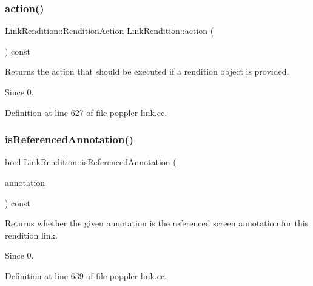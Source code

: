 \subsubsection{\texorpdfstring{action()}{action()}}
{\footnotesize\ttfamily \hyperlink{class_poppler_1_1_link_rendition_aede1a6b7156fe8973bdbeda39173704d}{Link\+Rendition\+::\+Rendition\+Action} Link\+Rendition\+::action (\begin{DoxyParamCaption}{ }\end{DoxyParamCaption}) const}

Returns the action that should be executed if a rendition object is provided.

\begin{DoxySince}{Since}
0. 
\end{DoxySince}


Definition at line 627 of file poppler-\/link.\+cc.

\mbox{\label{class_poppler_1_1_link_rendition_a91fad039261a67d42a94b9284e8ef048}} 
\subsubsection{\texorpdfstring{is\+Referenced\+Annotation()}{isReferencedAnnotation()}}
{\footnotesize\ttfamily bool Link\+Rendition\+::is\+Referenced\+Annotation (\begin{DoxyParamCaption}\item[{const \hyperlink{class_poppler_1_1_screen_annotation}{Screen\+Annotation} $\ast$}]{annotation }\end{DoxyParamCaption}) const}

Returns whether the given {\ttfamily annotation} is the referenced screen annotation for this rendition {\ttfamily link}.

\begin{DoxySince}{Since}
0. 
\end{DoxySince}


Definition at line 639 of file poppler-\/link.\+cc.

\mbox{\label{class_poppler_1_1_link_rendition_a4b43aec3a2a271aa40579e3f702ab91e}} 

